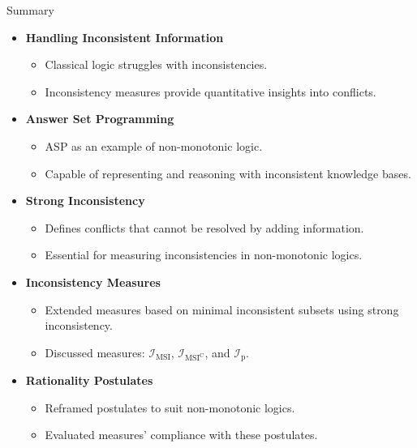 \begin{frame}{Summary}
    \begin{itemize}
        \item \textbf{Handling Inconsistent Information}
              \begin{itemize}
                  \item Classical logic struggles with inconsistencies.
                  \item Inconsistency measures provide quantitative insights into conflicts.
              \end{itemize}
        \item \textbf{Answer Set Programming}
              \begin{itemize}
                  \item ASP as an example of non-monotonic logic.
                  \item Capable of representing and reasoning with inconsistent knowledge bases.
              \end{itemize}
        \item \textbf{Strong Inconsistency}
              \begin{itemize}
                  \item Defines conflicts that cannot be resolved by adding information.
                  \item Essential for measuring inconsistencies in non-monotonic logics.
              \end{itemize}
        \item \textbf{Inconsistency Measures}
              \begin{itemize}
                  \item Extended measures based on minimal inconsistent subsets using strong inconsistency.
                  \item Discussed measures: $\mathcal{I}_{\text{MSI}}$, $\mathcal{I}_{\text{MSI}^\text{C}}$, and $\mathcal{I}_{\text{p}}$.
              \end{itemize}
        \item \textbf{Rationality Postulates}
              \begin{itemize}
                  \item Reframed postulates to suit non-monotonic logics.
                  \item Evaluated measures' compliance with these postulates.
              \end{itemize}
    \end{itemize}
\end{frame}